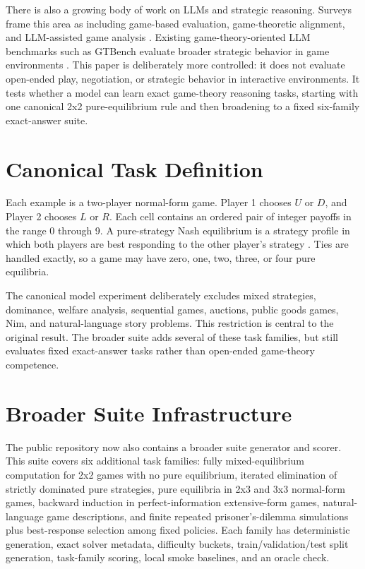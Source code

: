 \documentclass[11pt]{article}
\begin{document}
There is also a growing body of work on LLMs and strategic reasoning. Surveys frame this area as including game-based evaluation, game-theoretic alignment, and LLM-assisted game analysis \cite{sun2025gametheorysurvey}. Existing game-theory-oriented LLM benchmarks such as GTBench evaluate broader strategic behavior in game environments \cite{duan2024gtbench}. This paper is deliberately more controlled: it does not evaluate open-ended play, negotiation, or strategic behavior in interactive environments. It tests whether a model can learn exact game-theory reasoning tasks, starting with one canonical 2x2 pure-equilibrium rule and then broadening to a fixed six-family exact-answer suite.

\section{Canonical Task Definition}

Each example is a two-player normal-form game. Player 1 chooses $U$ or $D$, and Player 2 chooses $L$ or $R$. Each cell contains an ordered pair of integer payoffs in the range 0 through 9. A pure-strategy Nash equilibrium is a strategy profile in which both players are best responding to the other player's strategy \cite{nash1950equilibrium,nash1951noncooperative}. Ties are handled exactly, so a game may have zero, one, two, three, or four pure equilibria.

The canonical model experiment deliberately excludes mixed strategies, dominance, welfare analysis, sequential games, auctions, public goods games, Nim, and natural-language story problems. This restriction is central to the original result. The broader suite adds several of these task families, but still evaluates fixed exact-answer tasks rather than open-ended game-theory competence.

\section{Broader Suite Infrastructure}

The public repository now also contains a broader suite generator and scorer. This suite covers six additional task families: fully mixed-equilibrium computation for 2x2 games with no pure equilibrium, iterated elimination of strictly dominated pure strategies, pure equilibria in 2x3 and 3x3 normal-form games, backward induction in perfect-information extensive-form games, natural-language game descriptions, and finite repeated prisoner's-dilemma simulations plus best-response selection among fixed policies. Each family has deterministic generation, exact solver metadata, difficulty buckets, train/validation/test split generation, task-family scoring, local smoke baselines, and an oracle check.
\end{document}
